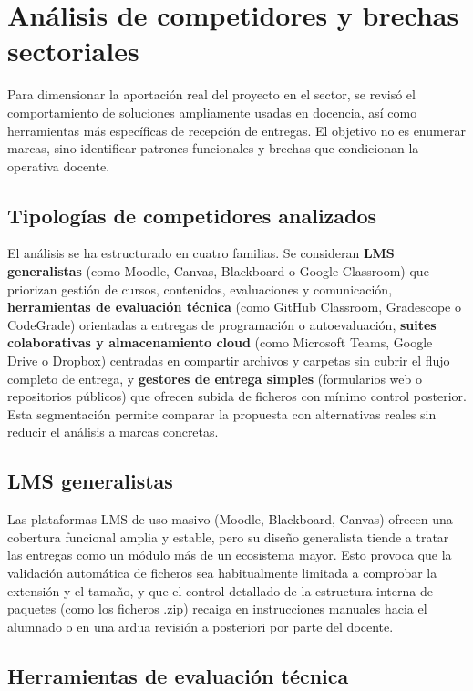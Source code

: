 \FloatBarrier
\section{An\'alisis de competidores y brechas sectoriales}

Para dimensionar la aportaci\'on real del proyecto en el sector,
se revis\'o el comportamiento de soluciones ampliamente usadas
en docencia, as\'i como herramientas m\'as espec\'ificas de recepci\'on
de entregas. El objetivo no es enumerar marcas, sino identificar
patrones funcionales y brechas que condicionan la operativa docente.

\subsection{Tipolog\'ias de competidores analizados}

El an\'alisis se ha estructurado en cuatro familias. Se consideran \textbf{LMS generalistas} (como Moodle, Canvas, Blackboard o Google Classroom) que priorizan gesti\'on de cursos, contenidos, evaluaciones y comunicaci\'on, \textbf{herramientas de evaluaci\'on t\'ecnica} (como GitHub Classroom, Gradescope o CodeGrade) orientadas a entregas de programaci\'on o autoevaluaci\'on, \textbf{suites colaborativas y almacenamiento cloud} (como Microsoft Teams, Google Drive o Dropbox) centradas en compartir archivos y carpetas sin cubrir el flujo completo de entrega, y \textbf{gestores de entrega simples} (formularios web o repositorios p\'ublicos) que ofrecen subida de ficheros con m\'inimo control posterior. Esta segmentaci\'on permite comparar la propuesta con alternativas reales sin reducir el an\'alisis a marcas concretas.

\subsection{LMS generalistas}

Las plataformas LMS de uso masivo (Moodle, Blackboard, Canvas) ofrecen una cobertura funcional amplia y estable, pero su dise\~no generalista tiende a tratar las entregas como un m\'odulo m\'as de un ecosistema mayor. Esto provoca que la validaci\'on autom\'atica de ficheros sea habitualmente limitada a comprobar la extensi\'on y el tama\~no, y que el control detallado de la estructura interna de paquetes (como los ficheros .zip) recaiga en instrucciones manuales hacia el alumnado o en una ardua revisi\'on a posteriori por parte del docente.

\subsection{Herramientas de evaluaci\'on t\'ecnica}

